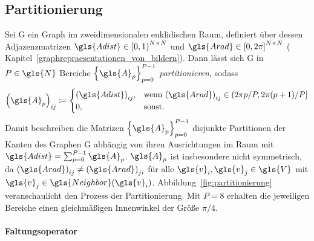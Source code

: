 \subsection{Partitionierung}
\label{partitionierung}



Sei \gls{G} ein Graph im zweidimensionalen euklidischen Raum, definiert über dessen Adjazenzmatrizen $\gls{Adist} \in {\left[0, 1\right)}^{N \times N}$ und $\gls{Arad} \in {\left[0, 2\pi\right]}^{N \times N}$ (\vgl{} Kapitel~\ref{graphrepraesentationen_von_bildern}).
Dann lässt sich \gls{G} in $P \in \gls{N}$ Bereiche ${\left\{\gls{A}_p\right\}}_{p=0}^{P-1}$ \emph{partitionieren}, sodass
\begin{equation*}
  {\left(\gls{A}_p\right)}_{ij} \coloneqq \begin{cases}
    {\left(\gls{Adist}\right)}_{ij}, & \text{wenn } {\left(\gls{Arad}\right)}_{ij} \in \left(2\pi p/P, 2\pi\left(p+1\right)/P\right]\\
    0, & \text{sonst.}
  \end{cases}
\end{equation*}
Damit beschreiben die Matrizen ${\left\{\gls{A}_p\right\}}_{p=0}^{P-1}$ disjunkte Partitionen der Kanten des Graphen \gls{G} abhängig von ihren Ausrichtungen im Raum mit $\gls{Adist} = \sum_{p=0}^{P-1} \gls{A}_p$.
$\gls{A}_p$ ist insbesondere nicht symmetrisch, da ${\left(\gls{Arad}\right)}_{ij} \neq {\left(\gls{Arad}\right)}_{ji}$ für alle $\gls{v}_i, \gls{v}_j \in \gls{V}$ mit $\gls{v}_j \in \gls{Neighbor}\left(\gls{v}_i\right)$.
Abbildung~\ref{fig:partitionierung} veranschaulicht den Prozess der Partitionierung.
Mit $P = 8$ erhalten die jeweiligen Bereiche \zB{} einen gleichmäßigen Innenwinkel der Größe $\pi/4$.

\paragraph{Faltungsoperator}
\label{partitionierung_faltungsoperator}

